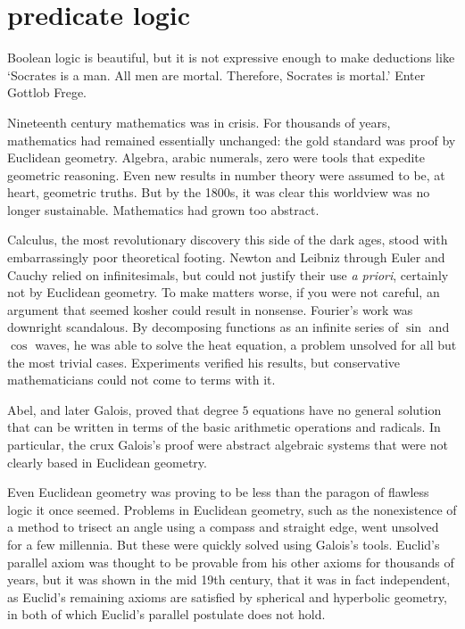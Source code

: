 \documentclass{scrbook}
\begin{document}
\chapter[Predicate Logic]{predicate logic}
Boolean logic is beautiful, but it is not expressive enough to make deductions like `Socrates is a man. All men are mortal. Therefore, Socrates is mortal.' Enter Gottlob Frege. 

Nineteenth century mathematics was in crisis. For thousands of years, mathematics had remained essentially unchanged: the gold standard was proof by Euclidean geometry. Algebra, arabic numerals, zero were tools that expedite geometric reasoning. Even new results in number theory were assumed to be, at heart, geometric truths. But by the 1800s, it was clear this worldview was no longer sustainable. Mathematics had grown too abstract.

Calculus, the most revolutionary discovery this side of the dark ages, stood with embarrassingly poor theoretical footing. Newton and Leibniz through Euler and Cauchy relied on infinitesimals, but could not justify their use \emph{a priori}, certainly not by Euclidean geometry. To make matters worse, if you were not careful, an argument that seemed kosher could result in nonsense. 
Fourier's work was downright scandalous. By decomposing functions as an infinite series of $\sin$ and $\cos$ waves, he was able to solve the heat equation, a problem unsolved for all but the most trivial cases. Experiments verified his results, but conservative mathematicians could not come to terms with it. 

Abel, and later Galois, proved that degree $5$ equations have no general solution that can be written in terms of the basic arithmetic operations and radicals. In particular, the crux Galois's proof were abstract algebraic systems that were not clearly based in Euclidean geometry. 

Even Euclidean geometry was proving to be less than the paragon of flawless logic it once seemed. Problems in Euclidean geometry, such as the nonexistence of a method to trisect an angle using a compass and straight edge, went unsolved for a few millennia. But these were quickly solved using Galois's tools. Euclid's parallel axiom was thought to be provable from his other axioms for thousands of years, but it was shown in the mid 19th century, that it was in fact independent, as Euclid's remaining axioms are satisfied by spherical and hyperbolic geometry, in both of which Euclid's parallel postulate does not hold. 
\end{document}

